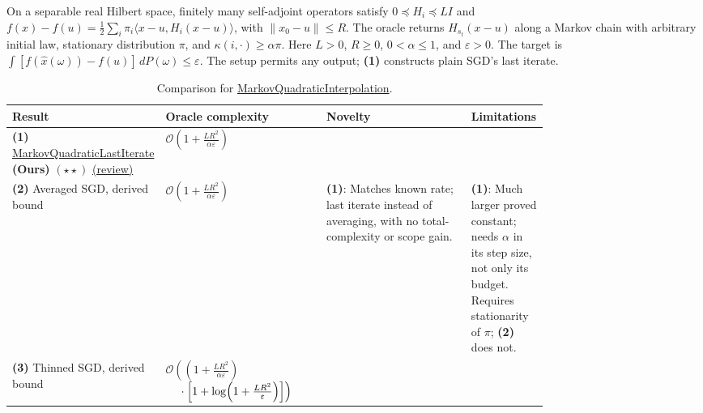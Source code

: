 \begin{table}[tp]
\centering
\caption{Comparison for \href{https://github.com/k3nfalt/longtails/blob/main/LongTails/Setups/MarkovQuadraticInterpolation.lean}{MarkovQuadraticInterpolation}.}\label{tab:MarkovQuadraticInterpolation}
\parbox{\linewidth}{\footnotesize On a separable real Hilbert space, finitely many self-adjoint operators satisfy $0\preceq H_i\preceq LI$ and $f(x)-f(u)=\frac12\sum_i\pi_i\langle x-u,H_i(x-u)\rangle$, with $\|x_0-u\|\le R$. The oracle returns $H_{s_t}(x-u)$ along a Markov chain with arbitrary initial law, stationary distribution $\pi$, and $\kappa(i,\cdot)\ge\alpha\pi$. Here $L>0$, $R\ge0$, $0<\alpha\le1$, and $\varepsilon>0$. The target is $\int[f(\widehat x(\omega))-f(u)]\,dP(\omega)\le\varepsilon$. The setup permits any output; \textbf{(1)} constructs plain SGD's last iterate.}\par\smallskip
\begin{threeparttable}
\footnotesize
\setlength{\tabcolsep}{4pt}\renewcommand{\arraystretch}{1.25}
\begin{tabularx}{\linewidth}{@{}>{\raggedright\arraybackslash}p{0.20\linewidth}>{\raggedright\arraybackslash}p{0.30\linewidth}>{\raggedright\arraybackslash}p{0.27\linewidth}>{\raggedright\arraybackslash}X@{}}
\toprule
\textbf{Result} & \textbf{Oracle complexity} & \textbf{Novelty} & \textbf{Limitations} \\
\midrule
\textbf{(1)} \href{https://github.com/k3nfalt/longtails/blob/main/LongTails/Theorems/MarkovQuadraticLastIterate.lean}{Markov\allowbreak Quadratic\allowbreak Last\allowbreak Iterate} \textbf{(Ours)} $(\star\star)$ \href{https://github.com/k3nfalt/longtails/blob/main/scripts/reviews/MarkovQuadraticLastIterate.md}{(review)}
& $\mathcal{O}\!\left(1+\frac{LR^2}{\alpha\varepsilon}\right)$ & & \\
\midrule[1.2pt]
\textbf{(2)} Averaged SGD, derived bound
& $\mathcal{O}\!\left(1+\frac{LR^2}{\alpha\varepsilon}\right)$
& \textbf{(1)}: Matches known rate; last iterate instead of averaging, with no total-complexity or scope gain.
& \textbf{(1)}: Much larger proved constant; needs $\alpha$ in its step size, not only its budget. Requires stationarity of $\pi$; \textbf{(2)} does not. \\
\midrule
\textbf{(3)} Thinned SGD, derived bound \citep{mqNagaraj2020,mqDerezinskiDong2026v1}
& $\mathcal{O}\!\left(\left(1+\frac{LR^2}{\alpha\varepsilon}\right)\right.$\newline
$\left.\vphantom{\frac{LR^2}{\alpha\varepsilon}}\quad\cdot\left[1+\log\!\left(1+\frac{LR^2}{\varepsilon}\right)\right]\right)$\newline

\end{tabularx}
\end{threeparttable}
\end{table}
